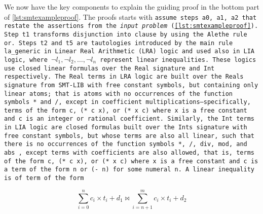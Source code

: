 We now have the key components to explain the guiding proof in the bottom part of \cref{lst:smtexampleproof}.
The proofs starts with \tt{assume} steps \tt{a0}, \tt{a1}, \tt{a2} that restate the assertions from the \textit{input problem} (\cref{lst:smtexampleproof}).
Step \tt{t1} transforms disjunction into clause by using the Alethe rule \tt{or}.
Steps \tt{t2} and \tt{t5} are tautologies introduced by the main rule \tt{la\_generic}
in Linear Real Arithmetic (LRA) logic and used also in LIA logic, where \colorbox{green!30}{$\neg l_1, \neg l_2,\dots, \neg l_n$} represent linear inequalities.
These logics use closed linear formulas over the \lstinline[language=SMT]{Real} signature and \lstinline[language=SMT]{Int} respectively.
The \lstinline[language=SMT]{Real} terms in \tt{LRA} logic are built over the Reals signature from SMT-LIB with free constant symbols, but containing only linear atoms; that is
atoms with no occurrences of the function symbols \lstinline[language=SMT]{*} and \lstinline[language=SMT]{/}, except in coefficient multiplications—specifically, terms of the form 
\lstinline[language=SMT]{c}, \lstinline[language=SMT]{(* c x)}, or \lstinline[language=SMT]{(* x c)}  where \lstinline[language=SMT]{x} is a free constant and  \lstinline[language=SMT]{c} is an integer or rational coefficient.
Similarly, the \lstinline[language=SMT]{Int} terms in \tt{LIA} logic are closed formulas built over the
Ints signature with free constant symbols, but whose terms are also all linear, such that there is no occurrences of the function symbols \lstinline[language=SMT]{*}, \lstinline[language=SMT]{/}, \lstinline[language=SMT]{div}, \lstinline[language=SMT]{mod}, and \lstinline[language=SMT]{abs}
, except terms with coefficients are also allowed, that is, terms of the form \lstinline[language=SMT]{c}, \lstinline[language=SMT]{(* c x)}, or \lstinline[language=SMT]{(* x c)}
where \lstinline[language=SMT]{x} is a free constant and \lstinline[language=SMT]{c} is a term of the form \lstinline[language=SMT]{n} or \lstinline[language=SMT]{(- n)} for some numeral \tt{n}.
A linear inequality is of term of the form

\begin{equation}
\sum_{i=0}^{n}c_i\times{}t_i + d_1\bowtie \sum_{i=n+1}^{m} c_i\times{}t_i + d_2
\label{eqn:inequality}
\end{equation}

